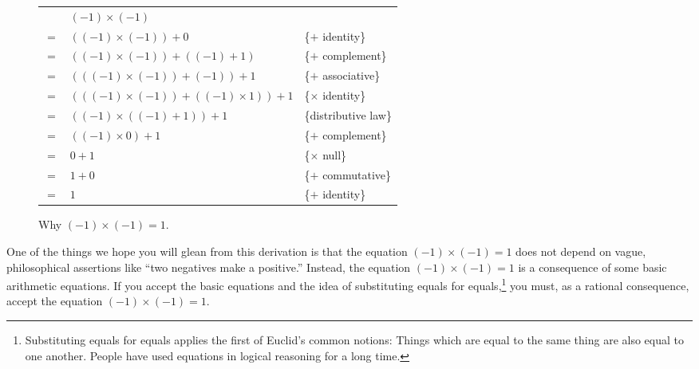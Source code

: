 \begin{figure}
\begin{center}
\begin{spacing}{0.9}
\begin{tabular}{lll}
    & $(-1)\times(-1)$                            & \\
$=$ & $((-1)\times(-1)) + 0$                      & \{$+$ identity\} \\
$=$ & $((-1)\times(-1)) + ((-1) + 1)$             & \{$+$ complement\} \\
$=$ & $(((-1)\times(-1)) + (-1)) + 1$             & \{$+$ associative\} \\
$=$ & $(((-1)\times(-1)) + ((-1) \times 1)) + 1$  & \{$\times$ identity\} \\
$=$ & $((-1)\times((-1) + 1)) + 1$                & \{distributive law\} \\
$=$ & $((-1)\times 0) + 1$                        & \{$+$ complement\} \\
$=$ & $0 + 1$                                     & \{$\times$ null\} \\
$=$ & $1 + 0$                                     & \{$+$ commutative\} \\
$=$ & $1$                                         & \{$+$ identity\} \\
\end{tabular}
\end{spacing}
\end{center}
\caption{Why $(-1)\times(-1)=1$.}
\label{fig-02-02}
\end{figure}

One of the things we hope you will glean from this derivation is that
the equation $(-1)\times(-1) = 1$ does not depend on vague,
philosophical assertions like ``two negatives make a positive.''
Instead, the equation $(-1)\times(-1) = 1$ is a consequence of some
basic arithmetic equations. If you accept the basic equations
and the idea of substituting equals for equals,\footnote{Substituting
equals for equals applies the first of
Euclid's common notions:
Things which are equal to the same thing are also equal to one another.
People have used equations in logical reasoning for a long time.}
you must, as a rational consequence, accept the equation
$(-1)\times(-1) = 1$.

